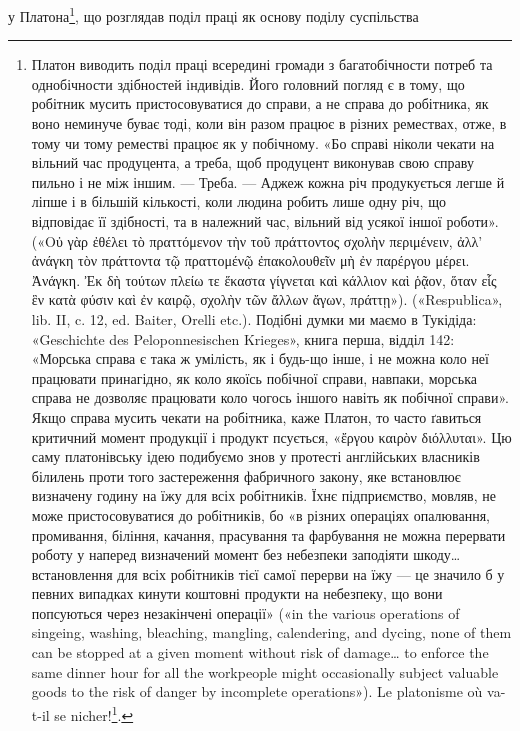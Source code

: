 у Платона\footnote{
Платон виводить поділ праці всередині громади з багатобічности
потреб та однобічности здібностей індивідів. Його головний погляд є в
тому, що робітник мусить пристосовуватися до справи, а не справа до
робітника, як воно неминуче буває тоді, коли він разом працює в різних
ремествах, отже, в тому чи тому реместві працює як у побічному. «Бо
справі ніколи чекати на вільний час продуцента, а треба, щоб продуцент
виконував свою справу пильно і не між іншим. — Треба. — Аджеж кожна
річ продукується легше й ліпше і в більшій кількості, коли людина робить
лише одну річ, що відповідає її здібності, та в належний час, вільний
від усякої іншої роботи». («\textgreek{Οὐ γὰρ ἐθέλει τὸ πραττόμενον τὴν τοῦ πράττοντος σχολὴν περιμένειν, ἀλλ’
ἀνάγκη τὸν πράττοντα τῷ πραττομένῷ ἐπακολουθεῖν μὴ ἐν παρέργου μέρει. \textemdash{} Ἀνάγκη. Ἐκ δὴ τούτων πλείω
τε ἕκαστα γίγνεται καὶ κάλλιον καὶ ῥᾷον, ὅταν εἷς ἓν κατὰ φύσιν καὶ ἐν καιρῷ, σχολὴν τῶν ἄλλων ἄγων,
πράττῃ»}). («Respublica», lib. II, c. 12,
ed. Baiter, Orelli etc.). Подібні думки ми маємо в Тукідіда: «Geschichte
des Peloponnesischen Krieges», книга перша, відділ 142: «Морська справа
є така ж умілість, як і будь-що інше, і не можна коло неї працювати принагідно,
як коло якоїсь побічної справи, навпаки, морська справа не
дозволяє працювати коло чогось іншого навіть як побічної справи».
Якщо справа мусить чекати на робітника, каже Платон, то часто ґавиться
критичний момент продукції і продукт псується, «\textgreek{ἔργου καιρὸν διόλλυται}». Цю
саму платонівську ідею подибуємо знов у протесті англійських власників
білилень проти того застереження фабричного закону, яке встановлює визначену
годину на їжу для всіх робітників. Їхнє підприємство, мовляв, не
може пристосовуватися до робітників, бо «в різних операціях опалювання,
промивання, біління, качання, прасування та фарбування не можна
перервати роботу у наперед визначений момент без небезпеки заподіяти
шкоду\dots{} встановлення для всіх робітників тієї самої перерви на їжу —
це значило б у певних випадках кинути коштовні продукти на небезпеку,
що вони попсуються через незакінчені операції» («in the various operations
of singeing, washing, bleaching, mangling, calendering, and dycing,
none of them can be stopped at a given moment without risk of damage\dots{}
to enforce the same dinner hour for all the workpeople might occasionally
subject valuable goods to the risk of danger by incomplete operations»).
Le platonisme où va-t-il se nicher!\footnote*{
Куди ще може продертись платонізм! \emph{Ред.}
}.
}, що розглядав поділ праці як основу поділу суспільства
